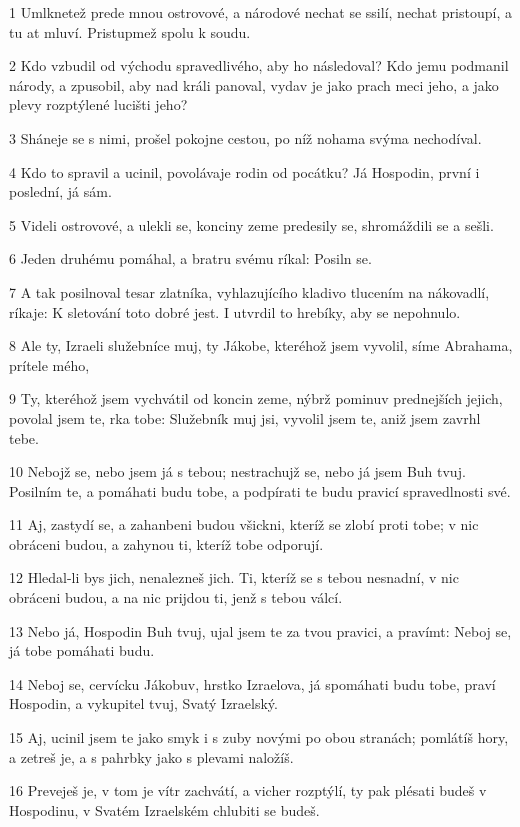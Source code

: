 \par 1 Umlknetež prede mnou ostrovové, a národové nechat se ssilí, nechat pristoupí, a tu at mluví. Pristupmež spolu k soudu.
\par 2 Kdo vzbudil od východu spravedlivého, aby ho následoval? Kdo jemu podmanil národy, a zpusobil, aby nad králi panoval, vydav je jako prach meci jeho, a jako plevy rozptýlené lucišti jeho?
\par 3 Sháneje se s nimi, prošel pokojne cestou, po níž nohama svýma nechodíval.
\par 4 Kdo to spravil a ucinil, povolávaje rodin od pocátku? Já Hospodin, první i poslední, já sám.
\par 5 Videli ostrovové, a ulekli se, konciny zeme predesily se, shromáždili se a sešli.
\par 6 Jeden druhému pomáhal, a bratru svému ríkal: Posiln se.
\par 7 A tak posilnoval tesar zlatníka, vyhlazujícího kladivo tlucením na nákovadlí, ríkaje: K sletování toto dobré jest. I utvrdil to hrebíky, aby se nepohnulo.
\par 8 Ale ty, Izraeli služebníce muj, ty Jákobe, kteréhož jsem vyvolil, síme Abrahama, prítele mého,
\par 9 Ty, kteréhož jsem vychvátil od koncin zeme, nýbrž pominuv prednejších jejich, povolal jsem te, rka tobe: Služebník muj jsi, vyvolil jsem te, aniž jsem zavrhl tebe.
\par 10 Nebojž se, nebo jsem já s tebou; nestrachujž se, nebo já jsem Buh tvuj. Posilním te, a pomáhati budu tobe, a podpírati te budu pravicí spravedlnosti své.
\par 11 Aj, zastydí se, a zahanbeni budou všickni, kteríž se zlobí proti tobe; v nic obráceni budou, a zahynou ti, kteríž tobe odporují.
\par 12 Hledal-li bys jich, nenalezneš jich. Ti, kteríž se s tebou nesnadní, v nic obráceni budou, a na nic prijdou ti, jenž s tebou válcí.
\par 13 Nebo já, Hospodin Buh tvuj, ujal jsem te za tvou pravici, a pravímt: Neboj se, já tobe pomáhati budu.
\par 14 Neboj se, cervícku Jákobuv, hrstko Izraelova, já spomáhati budu tobe, praví Hospodin, a vykupitel tvuj, Svatý Izraelský.
\par 15 Aj, ucinil jsem te jako smyk i s zuby novými po obou stranách; pomlátíš hory, a zetreš je, a s pahrbky jako s plevami naložíš.
\par 16 Preveješ je, v tom je vítr zachvátí, a vicher rozptýlí, ty pak plésati budeš v Hospodinu, v Svatém Izraelském chlubiti se budeš.

